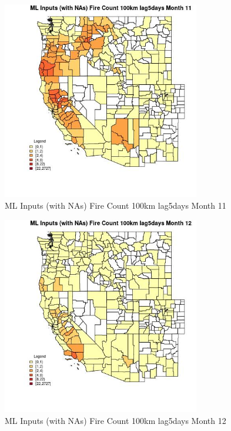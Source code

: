 \begin{figure} 
\centering  
\includegraphics[width=0.77\textwidth]{Code_Outputs/Report_ML_input_PM25_Step4_part_f_de_duplicated_aveswNAs_CountyFire_Count_100km_lag5daysmedianMonth11.jpg} 
\caption{\label{fig:Report_ML_input_PM25_Step4_part_f_de_duplicated_aveswNAsCountyFire_Count_100km_lag5daysmedianMonth11}ML Inputs (with NAs) Fire Count 100km lag5days Month 11} 
\end{figure} 
 

\begin{figure} 
\centering  
\includegraphics[width=0.77\textwidth]{Code_Outputs/Report_ML_input_PM25_Step4_part_f_de_duplicated_aveswNAs_CountyFire_Count_100km_lag5daysmedianMonth12.jpg} 
\caption{\label{fig:Report_ML_input_PM25_Step4_part_f_de_duplicated_aveswNAsCountyFire_Count_100km_lag5daysmedianMonth12}ML Inputs (with NAs) Fire Count 100km lag5days Month 12} 
\end{figure} 
 

